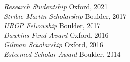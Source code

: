 \documentclass[margin]{res}
\begin{document}
\begin{resume}
                {\sl Research Studentship} \hfill Oxford, 2021 \\
                {\sl Stribic-Martin Scholarship} \hfill Boulder, 2017 \\
                        {\sl UROP Fellowship} \hfill Boulder, 2017 \\
                        {\sl Dawkins Fund Award} \hfill Oxford, 2016 \\
                        {\sl Gilman Scholarship} \hfill Oxford, 2016 \\
                        {\sl Esteemed Scholar Award} \hfill Boulder, 2014 \\




                

\end{resume}
\end{document}
